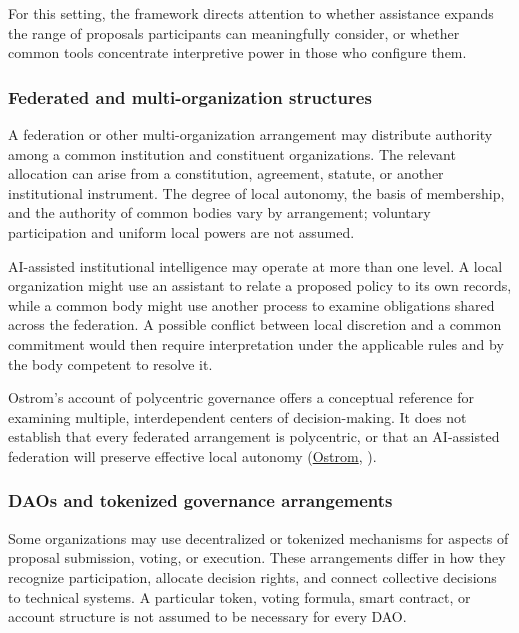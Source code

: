 \documentclass[
  10pt,
]{article}
\newcommand{\axCite}[2]{\hyperlink{cite.#1}{#2}, \citeyear{#1}}
\begin{document}
For this setting, the framework directs attention to whether assistance
expands the range of proposals participants can meaningfully consider,
or whether common tools concentrate interpretive power in those who
configure them.

\subsubsection{Federated and multi-organization
structures}\label{federated-and-multi-organization-structures}

A federation or other multi-organization arrangement may distribute
authority among a common institution and constituent organizations. The
relevant allocation can arise from a constitution, agreement, statute,
or another institutional instrument. The degree of local autonomy, the
basis of membership, and the authority of common bodies vary by
arrangement; voluntary participation and uniform local powers are not
assumed.

AI-assisted institutional intelligence may operate at more than one
level. A local organization might use an assistant to relate a proposed
policy to its own records, while a common body might use another process
to examine obligations shared across the federation. A possible conflict
between local discretion and a common commitment would then require
interpretation under the applicable rules and by the body competent to
resolve it.

Ostrom's account of polycentric governance offers a conceptual reference
for examining multiple, interdependent centers of decision-making. It
does not establish that every federated arrangement is polycentric, or
that an AI-assisted federation will preserve effective local autonomy
(\axCite{ostrom2010beyond}{Ostrom}).

\subsubsection{DAOs and tokenized governance
arrangements}\label{daos-and-tokenized-governance-arrangements}

Some organizations may use decentralized or tokenized mechanisms for
aspects of proposal submission, voting, or execution. These arrangements
differ in how they recognize participation, allocate decision rights,
and connect collective decisions to technical systems. A particular
token, voting formula, smart contract, or account structure is not
assumed to be necessary for every DAO.
\end{document}
